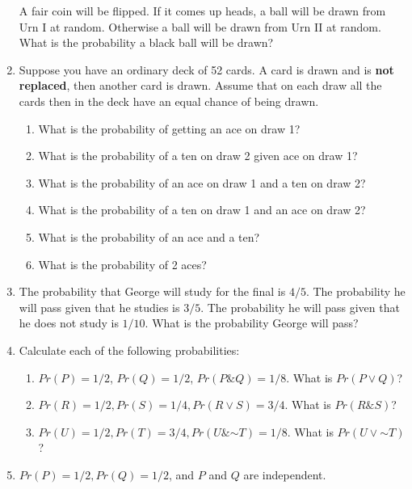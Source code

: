 \documentclass[justified]{tufte-book}
\providecommand{\tightlist}{%
  \setlength{\itemsep}{0pt}\setlength{\parskip}{0pt}}
\renewcommand{\neg}{\mathbin{\sim}}
\renewcommand{\wedge}{\mathbin{\&}}
\theoremstyle{definition}
\theoremstyle{definition}
\theoremstyle{definition}
\theoremstyle{remark}
\begin{document}
\begin{enumerate}
  A fair coin will be flipped. If it comes up heads, a ball will be drawn from Urn I at random. Otherwise a ball will be drawn from Urn II at random. What is the probability a black ball will be drawn?
\item
  Suppose you have an ordinary deck of 52 cards. A card is drawn and is \textbf{not replaced}, then another card is drawn. Assume that on each draw all the cards then in the deck have an equal chance of being drawn.

  \begin{enumerate}
  \def\labelenumii{\alph{enumii}.}
  \tightlist
  \item
    What is the probability of getting an ace on draw 1?
  \item
    What is the probability of a ten on draw 2 given ace on draw 1?
  \item
    What is the probability of an ace on draw 1 and a ten on draw 2?
  \item
    What is the probability of a ten on draw 1 and an ace on draw 2?
  \item
    What is the probability of an ace and a ten?
  \item
    What is the probability of 2 aces?
  \end{enumerate}
\item
  The probability that George will study for the final is \(4/5\). The probability he will pass given that he studies is \(3/5\). The probability he will pass given that he does not study is \(1/10\). What is the probability George will pass?
\item
  Calculate each of the following probabilities:

  \begin{enumerate}
  \def\labelenumii{\alph{enumii}.}
  \tightlist
  \item
    \(Pr(P) = 1/2\), \(Pr(Q) = 1/2\), \(Pr(P \wedge Q) = 1/8\). What is \(Pr(P \vee Q)\)?
  \item
    \(Pr(R) = 1/2, Pr(S) = 1/4, Pr(R \vee S) = 3/4\). What is \(Pr(R \wedge S)\)?
  \item
    \(Pr(U) = 1/2, Pr(T) = 3/4, Pr(U \wedge \neg T) = 1/8\). What is \(Pr(U \vee \neg T)\)?
  \end{enumerate}
\item
  \(Pr(P) = 1/2, Pr(Q) = 1/2\), and \(P\) and \(Q\) are independent.


\end{enumerate}
\end{document}
